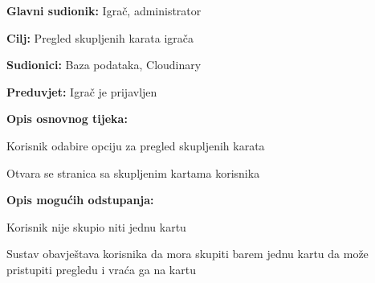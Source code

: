 					\noindent {}
					\begin{packed_item}
						
						\item \textbf{Glavni sudionik: }Igrač, administrator
						\item  \textbf{Cilj:} Pregled skupljenih karata igrača
						\item  \textbf{Sudionici:} Baza podataka, Cloudinary
						\item  \textbf{Preduvjet:} Igrač je prijavljen
						\item  \textbf{Opis osnovnog tijeka:}
						
						\item[] \begin{packed_enum}
							
							\item Korisnik odabire opciju za pregled skupljenih karata
							\item Otvara se stranica sa skupljenim kartama korisnika
						\end{packed_enum}

						\item  \textbf{Opis mogućih odstupanja:}
						
						\item[] \begin{packed_item}
							
							\item Korisnik nije skupio niti jednu kartu
							\item[] \begin{packed_enum}
								
								\item Sustav obavještava korisnika da mora skupiti barem jednu kartu da može pristupiti pregledu i vraća ga na kartu
								
							\end{packed_enum}
						\end{packed_item}
					\end{packed_item}
				
